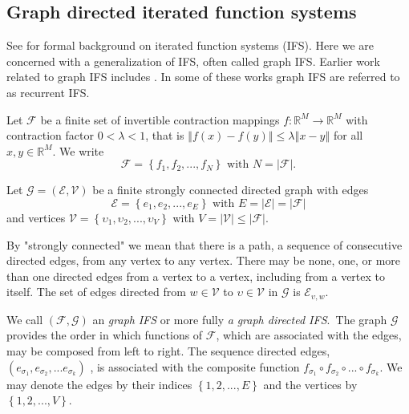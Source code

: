 \documentclass{amsproc}
\theoremstyle{plain}
\theoremstyle{definition}
\numberwithin{equation}{section}
\begin{document}
\subsection{Graph directed iterated function systems}

See \cite{hutchinson} for formal background on iterated function systems
(IFS). Here we are concerned with a generalization of IFS, often called
graph IFS. Earlier work related to graph IFS includes \cite{bandtTILE,
barnsleyFE2,bedfordGraph, dekking, mauldin, werner}. In some of these works
graph IFS are referred to as recurrent IFS.

Let $\mathcal{F}$ be a finite set of invertible contraction mappings $f:%
\mathbb{R}^{M}\rightarrow\mathbb{R}^{M}$ with contraction factor $%
0<\lambda<1 $, that is $\left\Vert f(x)-f(y)\right\Vert
\leq\lambda\left\Vert x-y\right\Vert $ for all $x,y\in\mathbb{R}^{M}$. We
write%
\begin{equation*}
\mathcal{F=}\left\{ f_{1},f_{2},...,f_{N}\right\} \text{ with }N=\left\vert 
\mathcal{F}\right\vert \text{.}
\end{equation*}

Let $\mathcal{G}=\left( \mathcal{E},\mathcal{V}\right) $ be a finite
strongly connected directed graph with edges 
\begin{equation*}
\mathcal{E=}\left\{ e_{1},e_{2},...,e_{E}\right\} \text{ with }E=\left\vert 
\mathcal{E}\right\vert =\left\vert \mathcal{F}\right\vert
\end{equation*}
and vertices $\mathcal{V=}\left\{ \upsilon_{1},\upsilon_{2},...,\upsilon
_{V}\right\} $ with $V=\left\vert \mathcal{V}\right\vert \leq\left\vert 
\mathcal{F}\right\vert $.

By "strongly connected" we mean that there is a path, a sequence of
consecutive directed edges, from any vertex to any vertex. There may be
none, one, or more than one directed edges from a vertex to a vertex,
including from a vertex to itself. The set of edges directed from $w\in%
\mathcal{V}$ to $\upsilon\in\mathcal{V}$ in $\mathcal{G}$ is $\mathcal{E}%
_{\upsilon,w}$.

We call $\left( \mathcal{F},\mathcal{G}\right) $ an \textit{graph} \textit{%
IFS }or more fully \textit{a} \textit{graph directed IFS}.\textit{\ }The
graph $\mathcal{G}$ provides the order in which functions of $\mathcal{F}$,
which are associated with the edges, may be composed from left to right. The
sequence directed edges, $(e_{\sigma_{1}},e_{\sigma_{2}},...e_{\sigma_{k}})$%
, is associated with the composite function $f_{\sigma_{1}}\circ
f_{\sigma_{2}}\circ...\circ f_{\sigma_{k}}$. We may denote the edges by
their indices $\left\{ 1,2,...,E\right\} $ and the vertices by $\left\{
1,2,...,V\right\} $.
\end{document}
